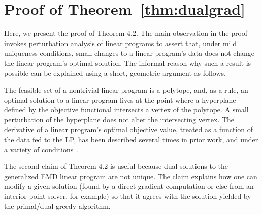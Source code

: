 \section{Proof of Theorem~\ref{thm:dualgrad}}\label{sec:app-proof}
\label{sec:proofthm}
Here, we present the proof of Theorem 4.2.  The main observation in the proof invokes perturbation analysis \cite{mangasarian1979nonlinear,ferris1991finite} of linear programs to assert that, under mild uniqueness conditions, small changes to a linear program's data does not change the linear program's optimal solution. The informal reason why such a result is possible can be explained using a  short,  geometric argument as follows. 

The feasible set of a nontrivial linear program is a polytope, and, as a rule, an optimal solution to a linear program lives at the point where a hyperplane defined by the objective functional intersects a vertex of the polytope. A small perturbation of the hyperplane does not alter the intersecting vertex. The derivative of a linear program's optimal objective value, treated as a function of the data fed to the LP, has been described several times in prior work, and under a variety of conditions~\cite{dewolf,freund1985postoptimal,agueh2011barycenters,Mills19578MV}.

The second claim of Theorem 4.2 is useful because dual solutions to the generalized EMD linear program are not unique.  The claim explains how one can modify a given solution (found by a direct gradient computation or else from an interior point solver, for example) so that it agrees with the solution yielded by the primal/dual greedy algorithm. 

